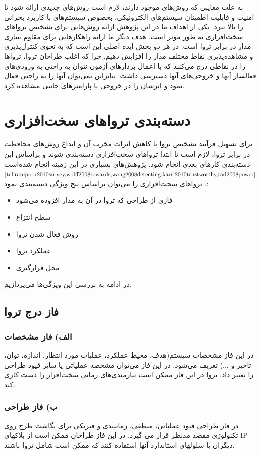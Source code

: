 به علت معایبی که روش‌های موجود دارند، لازم است روش‌های جدیدی ارائه شود تا امنیت و قابلیت اطمینان سیستم‌های الکترونیکی، بخصوص سیستم‌های با کاربرد بحرانی را بالا ببرد. یکی از اهداف ما در این پژوهش ارائه روش‌هایی برای تشخیص تروا‌های سخت‌افزاری به طور موثر است. هدف دیگر ما ارائه راهکارهایی برای مقاوم سازی مدار در برابر تروا است. در هر دو بخش ایده اصلی این است که به نحوی کنترل‌پذیری و مشاهده‌پذیری نقاط مختلف مدار را افزایش دهیم. چرا که اغلب طراحان تروا، تروا‌ها را در نقاطی درج می‌کنند که با اعمال بردارهای آزمون نتوان به راحتی به ورودی‌های فعالساز آنها  و خروجی‌های آنها دسترسی داشت. بنابراین نمی‌توان آنها را به راحتی فعال نمود و اثرشان را در خروجی یا پارامترهای جانبی مشاهده کرد.


\section{دسته‌بندی تروا‌های سخت‌افزاری}

برای تسهیل فرآیند تشخیص تروا یا کاهش اثرات مخرب آن و ابداع روش‌های محافظت در برابر تروا، لازم است تا ابتدا تروا‌های سخت‌افزاری دسته‌بندی شوند و براساس این دسته‌بندی کارهای بعدی انجام شود. پژوهش‌های بسیاری در این زمینه انجام شده‌است
$\cite{tehranipoor2010survey,wolff2008towards,wang2008detecting,karri2010trustworthy,rad2008power}$.
تروا‌های سخت‌افزاری را می‌توان براساس پنج ویژگی دسته‌بندی نمود: 

\begin{itemize}
	\item فازی از طراحی که تروا در آن به مدار افزوده می‌شود
	\item سطح انتزاع
	\item روش فعال شدن تروا
	\item عملکرد تروا
	\item محل قرارگیری
\end{itemize}

در ادامه به بررسی این ویژگی‌ها می‌پردازیم.

\subsection{فاز درج تروا}
\subsubsection{الف) فاز مشخصات}
در این فاز مشخصات سیستم(هدف، محیط عملکرد، عملیات مورد انتظار، اندازه، توان، تاخیر و ...) تعریف می‌شود. در این فاز می‌توان مشخصه عملیاتی یا سایر قیود طراحی را تغییر داد. تروا در این فاز ممکن است نیازمندی‌های زمانی سخت‌افزار را دست کاری کند.
\subsubsection {ب) فاز طراحی}
در فاز طراحی قیود عملیاتی،  منطقی، زمانبندی و فیزیکی برای نگاشت طرح روی تکنولوژی مقصد مدنظر قرار می گیرد. در این فاز طراحان ممکن است از بلاکهای IP دیگران یا سلولهای استاندارد آنها استفاده کنند که ممکن است شامل تروا باشند. 
